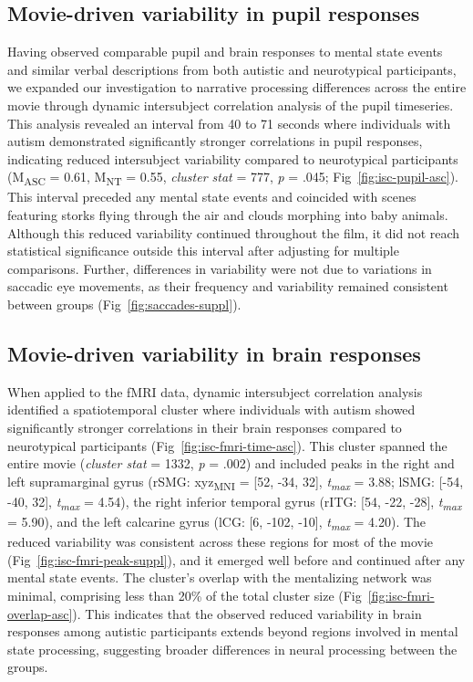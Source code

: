 \subsection{Movie-driven variability in pupil responses }
Having observed comparable pupil and brain responses to mental state events and similar verbal descriptions from both autistic and neurotypical participants, we expanded our investigation to narrative processing differences across the entire movie through dynamic intersubject correlation analysis of the pupil timeseries. This analysis revealed an interval from 40 to 71 seconds where individuals with autism demonstrated significantly stronger correlations in pupil responses, indicating reduced intersubject variability compared to neurotypical participants (M\textsubscript{ASC} = 0.61, M\textsubscript{NT} = 0.55, \textit{cluster stat} = 777, \textit{p} = .045; Fig~\ref{fig:isc-pupil-asc}). This interval preceded any mental state events and coincided with scenes featuring storks flying through the air and clouds morphing into baby animals. Although this reduced variability continued throughout the film, it did not reach statistical significance outside this interval after adjusting for multiple comparisons. Further, differences in variability were not due to variations in saccadic eye movements, as their frequency and variability remained consistent between groups (Fig~\ref{fig:saccades-suppl}).



\subsection{Movie-driven variability in brain responses}
When applied to the fMRI data, dynamic intersubject correlation analysis identified a spatiotemporal cluster where individuals with autism showed significantly stronger correlations in their brain responses compared to neurotypical participants (Fig~\ref{fig:isc-fmri-time-asc}). This cluster spanned the entire movie (\textit{cluster stat} = 1332, \textit{p} = .002) and included peaks in the right and left supramarginal gyrus (rSMG: xyz\textsubscript{MNI} = [52, -34, 32], \textit{t\textsubscript{max}} = 3.88; lSMG: [-54, -40, 32], \textit{t\textsubscript{max}} = 4.54), the right inferior temporal gyrus (rITG: [54, -22, -28], \textit{t\textsubscript{max}} = 5.90), and the left calcarine gyrus (lCG: [6, -102, -10], \textit{t\textsubscript{max}} = 4.20). The reduced variability was consistent across these regions for most of the movie (Fig~\ref{fig:isc-fmri-peak-suppl}), and it emerged well before and continued after any mental state events. The cluster's overlap with the mentalizing network was minimal, comprising less than 20\% of the total cluster size (Fig~\ref{fig:isc-fmri-overlap-asc}). This indicates that the observed reduced variability in brain responses among autistic participants extends beyond regions involved in mental state processing, suggesting broader differences in neural processing between the groups.

